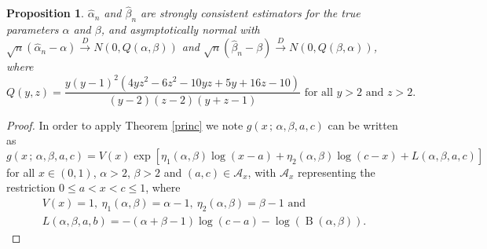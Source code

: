 \documentclass[12pt]{article} %
\newcommand{\on}{\operatorname}
\newtheorem{proposition}{Proposition}
\theoremstyle{definition}
\begin{document}
\begin{proposition} $\hat\alpha_n$ and $\hat\beta_n$ are strongly consistent estimators for the true parameters $\alpha$ and $\beta$, and asymptotically normal with $\sqrt{n}\left(\hat{\alpha}_n-\alpha\right)\overset{D}{\to} N\left(0,Q(\alpha,\beta)\right)$ and $\sqrt{n}\left(\hat{\beta}_n-\beta\right)\overset{D}{\to} N\left(0,Q(\beta,\alpha)\right)$, where
\begin{equation*}Q(y,z) = \frac{y(y - 1)^2(4yz^2 - 6z^2 - 10yz + 5y + 16z  - 10)}{(y - 2)(z - 2)(y + z - 1)}\mbox{ for all }y>2\mbox{ and }z>2.
\end{equation*}

\end{proposition}
\begin{proof} In order to apply Theorem \ref{princ}
we note $g(x\,;\,\alpha,\beta,a,c)$ can be written as \begin{equation*} g(x\,;\,\alpha,\beta,a,c)=V(x)\exp\left[\eta_1(\alpha,\beta)\log(x-a)+\eta_2(\alpha,\beta)\log(c-x)+L(\alpha,\beta,a,c)\right]
\end{equation*}
for all $x\in(0,1)$, $\alpha>2$, $\beta>2$ and $(a,c)\in\mathcal{A}_x$, with $\mathcal{A}_x$ representing the restriction $0\leq a<x<c\leq 1$, where
\begin{equation*}
\begin{aligned}V(x)=1,\ \eta_1(\alpha,\beta)=\alpha-1,\ \eta_2(\alpha,\beta)=\beta-1\mbox{ and }\\
L(\alpha,\beta,a,b)=-(\alpha+\beta-1)\log(c-a)-\log(\on{B}(\alpha,\beta)).
\end{aligned} 
\end{equation*}


\end{proof}
\end{document}
